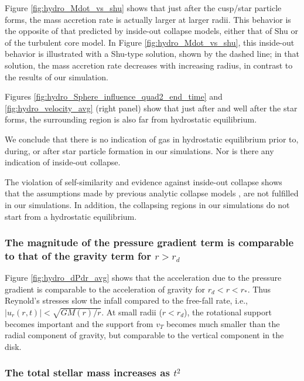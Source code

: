 \documentclass[../dissertation.tex]{subfiles}
\begin{document}
Figure \ref{fig:hydro_Mdot_vs_shu} shows that just after the cusp/star particle
forms, the mass accretion rate is actually larger at larger radii. This behavior is 
the opposite of that predicted by  
inside-out collapse models, either that of Shu or of the turbulent core model. In Figure
\ref{fig:hydro_Mdot_vs_shu}, this inside-out behavior is illustrated with a Shu-type solution, 
shown by the dashed line; in that solution, the mass accretion rate decreases 
with increasing radius, in contrast to the results of our simulation.

  

Figures \ref{fig:hydro_Sphere_influence_quad2_end_time} and \ref{fig:hydro_velocity_avg} (right panel) show
that just after and well after the star forms, the surrounding region is also far from
hydrostatic equilibrium.



We conclude that there is no indication of gas in hydrostatic equilibrium 
prior to, during, or after star particle formation in our simulations. Nor is there
any indication of inside-out collapse. 

The violation of self-similarity and evidence against inside-out collapse shows that the assumptions made by previous analytic collapse models
\citep{1977ApJ...214..488S,1992ApJ...396..631M,1997ApJ...476..750M,2003ApJ...585..850M}, 
are not fulfilled in our simulations.  In addition, 
the collapsing regions in our simulations do not start from a hydrostatic equilibrium.



\subsubsection{The magnitude of the pressure gradient term is comparable to that 
of the gravity term for $r>r_d$}

Figure \ref{fig:hydro_dPdr_avg} shows that the 
acceleration due to the pressure gradient is comparable to the 
acceleration of gravity for $r_d<r<r_*$. 
Thus Reynold's stresses slow the infall compared to the free-fall rate, i.e., $|u_r(r,t)|< \sqrt{GM(r)/r}$.  
At small radii ($r<r_d$), the rotational support becomes important and 
the support from $v_T$ becomes much smaller than the radial component
of gravity, but comparable to the vertical component in the disk.

\subsubsection{The total stellar mass increases as $t^2$}
\end{document}
